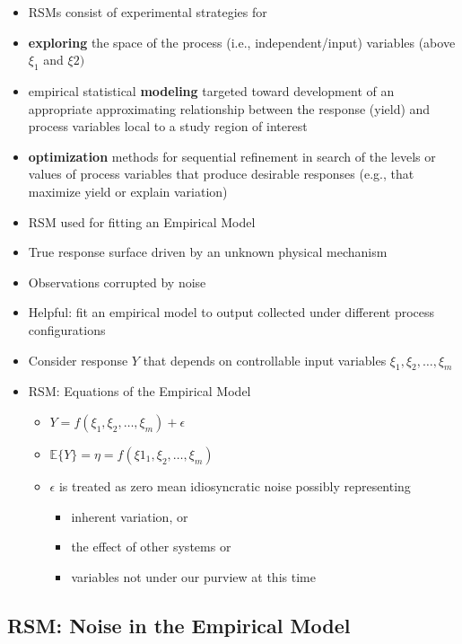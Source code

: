 \documentclass[
  letterpaper,
  DIV=11,
  numbers=noendperiod]{scrreprt}
\providecommand{\tightlist}{%
  \setlength{\itemsep}{0pt}\setlength{\parskip}{0pt}}\usepackage{longtable,booktabs,array}
\begin{document}
\begin{itemize}
\item
  RSMs consist of experimental strategies for
\item
  \textbf{exploring} the space of the process (i.e., independent/input)
  variables (above \(\xi_1\) and \(\xi2)\)
\item
  empirical statistical \textbf{modeling} targeted toward development of
  an appropriate approximating relationship between the response (yield)
  and process variables local to a study region of interest
\item
  \textbf{optimization} methods for sequential refinement in search of
  the levels or values of process variables that produce desirable
  responses (e.g., that maximize yield or explain variation)
\item
  RSM used for fitting an Empirical Model
\item
  True response surface driven by an unknown physical mechanism
\item
  Observations corrupted by noise
\item
  Helpful: fit an empirical model to output collected under different
  process configurations
\item
  Consider response \(Y\) that depends on controllable input variables
  \(\xi_1, \xi_2, \ldots, \xi_m\)
\item
  RSM: Equations of the Empirical Model

  \begin{itemize}
  \tightlist
  \item
    \(Y=f(\xi_1, \xi_2, \ldots, \xi_m) + \epsilon\)
  \item
    \(\mathbb{E}\{Y\} = \eta = f(\xi1_1, \xi_2, \ldots, \xi_m)\)
  \item
    \(\epsilon\) is treated as zero mean idiosyncratic noise possibly
    representing

    \begin{itemize}
    \tightlist
    \item
      inherent variation, or
    \item
      the effect of other systems or
    \item
      variables not under our purview at this time
    \end{itemize}
  \end{itemize}
\end{itemize}

\hypertarget{rsm-noise-in-the-empirical-model}{%
\subsection{RSM: Noise in the Empirical
Model}\label{rsm-noise-in-the-empirical-model}}
\end{document}
